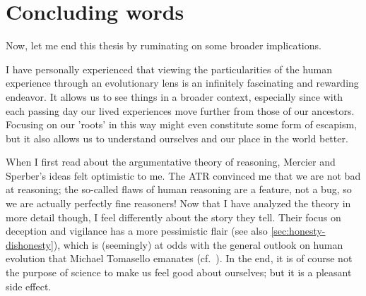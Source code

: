 \section*{Concluding words}
Now, let me end this thesis by ruminating on some broader implications.

I have personally experienced that viewing the particularities of the human experience through an evolutionary lens is an infinitely fascinating and rewarding endeavor. It allows us to see things in a broader context, especially since with each passing day our lived experiences move further from those of our ancestors. Focusing on our 'roots' in this way might even constitute some form of escapism, but it also allows us to understand ourselves and our place in the world better.

When I first read about the argumentative theory of reasoning, Mercier and Sperber's ideas felt optimistic to me. The ATR convinced me that we are not bad at reasoning; the so-called flaws of human reasoning are a feature, not a bug, so we are actually perfectly fine reasoners!
Now that I have analyzed the theory in more detail though, I feel differently about the story they tell. Their focus on deception and vigilance has a more pessimistic flair (see also \cref{sec:honesty-dishonesty}), which is (seemingly) at odds with the general outlook on human evolution that Michael Tomasello emanates (cf.~\citet{Tomasello09}). In the end, it is of course not the purpose of science to make us feel good about ourselves; but it is a pleasant side effect.
